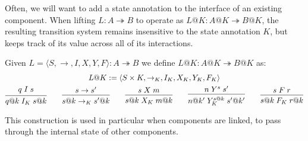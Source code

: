 \documentclass[acmsmall,screen,review,anonymous]{acmart}
\begin{document}
Often,
we will want to add a state annotation
to the interface of an existing component.
When lifting $L : A \twoheadrightarrow B$
to operate as $L@K : A@K \twoheadrightarrow B@K$,
the resulting transition system
remains insensitive to the state annotation $K$,
but keeps track of its value
across all of its interactions.

\begin{definition}[Lifting] \label{def:lift} %
Given %
$L = \langle S, {\rightarrow}, I, X, Y, F \rangle : A \twoheadrightarrow B$
we define $L@K : A@K \twoheadrightarrow B@K$ as:
\begin{gather*}
  L@K := \langle S \times K, {\rightarrow_K}, I_K, X_K, Y_K, F_K \rangle \\
 {\begin{prooftree}
    \hypo{q \mathrel{I} s}
    \infer1{q@k \mathrel{I_K} s@k}
  \end{prooftree}}
  \qquad
 {\begin{prooftree}
    \hypo{s \rightarrow s'}
    \infer1{s@k \rightarrow_K s'@k}
  \end{prooftree}}
  \qquad
 {\begin{prooftree}
    \hypo{s \mathrel{X} m}
    \infer1{s@k \mathrel{X_K} m@k}
  \end{prooftree}}
  \qquad
 {\begin{prooftree}
    \hypo{n \mathrel{Y}^s s'}
    \infer1{n@k' \mathrel{Y^{s@k}_K} s'@k'}
  \end{prooftree}}
  \qquad
 {\begin{prooftree}
    \hypo{s \mathrel{F} r}
    \infer1{s@k \mathrel{F_K} r@k}
  \end{prooftree}}
\end{gather*}
\end{definition}

This construction is used in particular when components are linked,
to pass through the internal state of other components.
\end{document}
